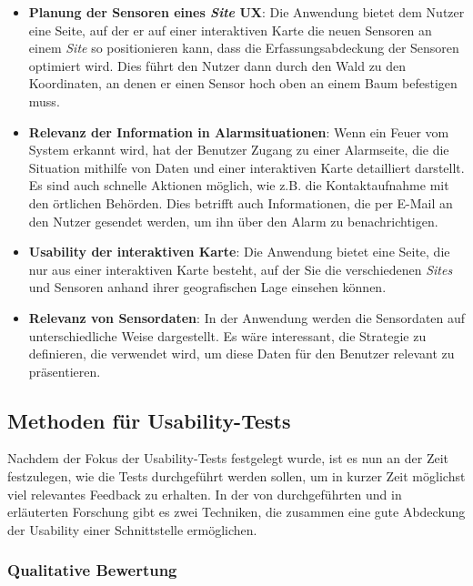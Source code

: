 \begin{itemize}
  \item \textbf{Planung der Sensoren eines \textit{Site} \ac{UX}}: Die Anwendung bietet dem Nutzer eine Seite, auf der er auf einer interaktiven Karte die neuen Sensoren an einem \textit{Site} so positionieren kann, dass die Erfassungsabdeckung der Sensoren optimiert wird. Dies führt den Nutzer dann durch den Wald zu den Koordinaten, an denen er einen Sensor hoch oben an einem Baum befestigen muss.
  \item \textbf{Relevanz der Information in Alarmsituationen}: Wenn ein Feuer vom System erkannt wird, hat der Benutzer Zugang zu einer Alarmseite, die die Situation mithilfe von Daten und einer interaktiven Karte detailliert darstellt. Es sind auch schnelle Aktionen möglich, wie z.B. die Kontaktaufnahme mit den örtlichen Behörden. Dies betrifft auch Informationen, die per E-Mail an den Nutzer gesendet werden, um ihn über den Alarm zu benachrichtigen.
  \item \textbf{Usability der interaktiven Karte}: Die Anwendung bietet eine Seite, die nur aus einer interaktiven Karte besteht, auf der Sie die verschiedenen \textit{Sites} und Sensoren anhand ihrer geografischen Lage einsehen können.
  \item \textbf{Relevanz von Sensordaten}: In der Anwendung werden die Sensordaten auf unterschiedliche Weise dargestellt. Es wäre interessant, die Strategie zu definieren, die verwendet wird, um diese Daten für den Benutzer relevant zu präsentieren.
\end{itemize}

\subsection{Methoden für Usability-Tests}

Nachdem der Fokus der Usability-Tests festgelegt wurde, ist es nun an der Zeit festzulegen, wie die Tests durchgeführt werden sollen, um in kurzer Zeit möglichst viel relevantes Feedback zu erhalten.
In der von \citeauthor{usability} durchgeführten und in  erläuterten Forschung gibt es zwei Techniken, die zusammen eine gute Abdeckung der Usability einer Schnittstelle ermöglichen.

\subsubsection{Qualitative Bewertung}

